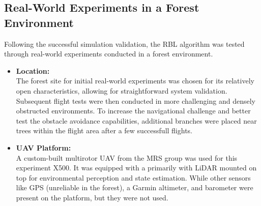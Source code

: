         \subsection{Real-World Experiments in a Forest Environment}
            Following the successful simulation validation, the \ac{RBL} algorithm was tested through real-world experiments conducted in a forest environment.
            \begin{itemize}
                \item \textbf{Location: } \\
                    The forest site for initial real-world experiments was chosen for its relatively open characteristics, allowing for straightforward system validation. 
                    Subsequent flight tests were then conducted in more challenging and densely obstructed environments.
                    To increase the navigational challenge and better test the obstacle avoidance capabilities, additional branches were placed near trees within the flight area after a few successfull flights. 
                \item \textbf{UAV Platform: } \\
                    A custom-built multirotor \ac{UAV} from the MRS group was used for this experiment X500. 
                    It was equipped with a primarily with LiDAR mounted on top for environmental perception and state estimation.
                    While other sensors like GPS (unreliable in the forest), a Garmin altimeter, and barometer were present on the platform, but they were not used.

\end{itemize}
